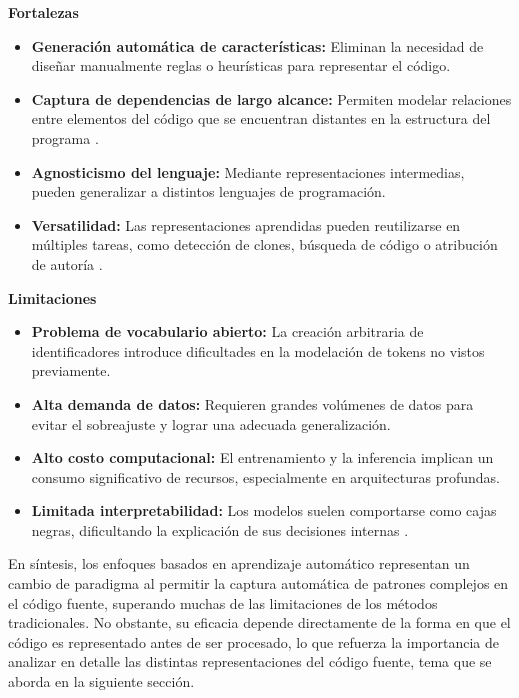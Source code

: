 \textbf{Fortalezas}
\begin{itemize}
    \item \textbf{Generación automática de características:} Eliminan la necesidad de diseñar manualmente reglas o heurísticas para representar el código.
    
    \item \textbf{Captura de dependencias de largo alcance:} Permiten modelar relaciones entre elementos del código que se encuentran distantes en la estructura del programa \cite{Le2021DeepLearning}.
    
    \item \textbf{Agnosticismo del lenguaje:} Mediante representaciones intermedias, pueden generalizar a distintos lenguajes de programación.
    
    \item \textbf{Versatilidad:} Las representaciones aprendidas pueden reutilizarse en múltiples tareas, como detección de clones, búsqueda de código o atribución de autoría \cite{Alon2018Code2Vec}.
\end{itemize}

\textbf{Limitaciones}
\begin{itemize}
    \item \textbf{Problema de vocabulario abierto:} La creación arbitraria de identificadores introduce dificultades en la modelación de tokens no vistos previamente\cite{Le2021DeepLearning}.
    
    \item \textbf{Alta demanda de datos:} Requieren grandes volúmenes de datos para evitar el sobreajuste y lograr una adecuada generalización.
    
    \item \textbf{Alto costo computacional:} El entrenamiento y la inferencia implican un consumo significativo de recursos, especialmente en arquitecturas profundas.
    
    \item \textbf{Limitada interpretabilidad:} Los modelos suelen comportarse como cajas negras, dificultando la explicación de sus decisiones internas \cite{Alon2018Code2Vec}.
\end{itemize}

En síntesis, los enfoques basados en aprendizaje automático representan un cambio de paradigma al permitir la captura automática de patrones complejos en el código fuente, superando muchas de las limitaciones de los métodos tradicionales. No obstante, su eficacia depende directamente de la forma en que el código es representado antes de ser procesado, lo que refuerza la importancia de analizar en detalle las distintas representaciones del código fuente, tema que se aborda en la siguiente sección.


